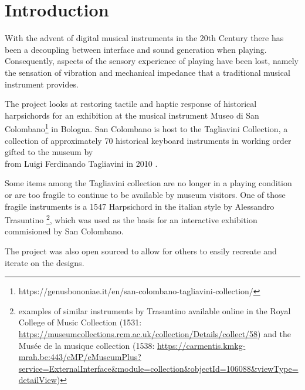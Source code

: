 \section{Introduction}\label{introduction}

With the advent of digital musical instruments in the 20th Century there
has been a decoupling between interface and sound generation when
playing. Consequently, aspects of the sensory experience of playing have
been lost, namely the sensation of vibration and mechanical impedance
that a traditional musical instrument provides.

The project looks at restoring tactile and haptic response of historical
harpsichords for an exhibition at the musical instrument Museo di San
Colombano\footnote{https://genusbononiae.it/en/san-colombano-tagliavini-collection/}
in Bologna. San Colombano is host to the Tagliavini Collection, a
collection of approximately 70 historical keyboard instruments in
working order \cite{Tagliavini2007} gifted to the museum by\\
from Luigi Ferdinando Tagliavini in 2010
\cite{SanColombano2010,Carlino2010}.

Some items among the Tagliavini collection are no longer in a playing
condition or are too fragile to continue to be available by museum
visitors. One of those fragile instruments is a 1547 Harpsichord in the
italian style by Alessandro Trasuntino
\cite{Wraight2024}\footnote{examples of similar instruments by
Trasuntino available online in the Royal College of Music Collection (1531:
\url{https://museumcollections.rcm.ac.uk/collection/Details/collect/58}) and the
Musée de la musique collection (1538:
\url{https://carmentis.kmkg-mrah.be:443/eMP/eMuseumPlus?service=ExternalInterface&module=collection&objectId=106088&viewType=detailView})
}, which was used as the basis for an interactive exhibition commisioned
by San Colombano.

The project was also open sourced to allow for others to easily recreate
and iterate on the designs.

